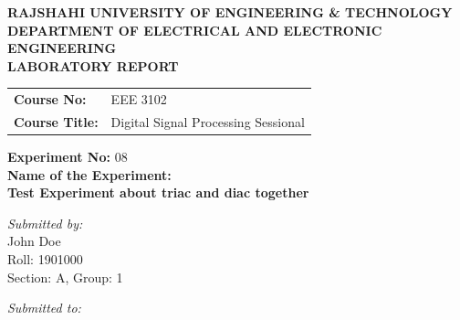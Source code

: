 \documentclass[12pt,a4paper]{article}
\begin{document}
\begin{titlepage}
    \sffamily
    \centering
    \vspace*{1cm}
    
    \Large \textbf{\MakeUppercase{ Rajshahi University of Engineering \& Technology }} \\
    \vspace{0.5cm}
    \large \textbf{\MakeUppercase{ Department of Electrical and Electronic Engineering }} \\
    
    \vspace{2.5cm}
    \Large \textbf{LABORATORY REPORT} \\
    \vspace{1cm}
    
    \begin{tabular}{ll}
        \textbf{Course No:} & EEE 3102 \\
        \textbf{Course Title:} & Digital Signal Processing Sessional \\
    \end{tabular}
    
    \vspace{2cm}
    
    \textbf{Experiment No:} 08 \\
    \vspace{0.5cm}
    \textbf{Name of the Experiment:} \\
    \Large \textbf{ Test Experiment about triac and diac together } \\
    
    \vspace{2.5cm}
    
    \begin{minipage}[t]{0.4\textwidth}
        \begin{flushleft} \large
            \emph{Submitted by:}\\
            John Doe \\
            Roll: 1901000 \\
            Section: A, Group: 1
        \end{flushleft}
    \end{minipage}
    \hfill
    \begin{minipage}[t]{0.5\textwidth}
        \begin{flushright} \large
            \emph{Submitted to:} \\
            

\end{flushright}
\end{minipage}
\end{titlepage}
\end{document}
